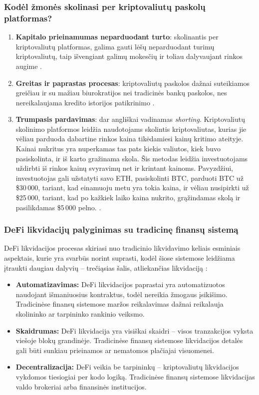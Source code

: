 \documentclass[]{VUMIFTemplateClass}
\begin{document}
\subsubsection{Kodėl žmonės skolinasi per kriptovaliutų paskolų platformas?}

\begin{enumerate}
    \item \textbf{Kapitalo prieinamumas neparduodant turto}: skolinantis per kriptovaliutų platformas, galima gauti lėšų neparduodant turimų kriptovaliutų, taip išvengiant galimų mokesčių ir toliau dalyvaujant rinkos augime \cite{kriptovaliutosio}.
    \item \textbf{Greitas ir paprastas procesas}: kriptovaliutų paskolos dažnai suteikiamos greičiau ir su mažiau biurokratijos nei tradicinės bankų paskolos, nes nereikalaujama kredito istorijos patikrinimo \cite{targettrend}.
    \item \textbf{Trumpasis pardavimas}: dar angliškai vadinamas \textit{shorting}. Kriptovaliutų skolinimo platformos leidžia naudotojams skolintis kriptovaliutas, kurias jie vėliau parduoda dabartine rinkos kaina tikėdamiesi kainų kritimo ateityje. Kainai nukritus yra nuperkamas tas pats kiekis valiutos, kiek buvo pasiskolinta, ir iš karto gražinama skola. Šis metodas leidžia investuotojams uždirbti iš rinkos kainų svyravimų net ir krintant kainoms. Pavyzdžiui, investuotojas gali užstatyti savo ETH, pasiskolinti BTC, parduoti BTC už \$30\,000, tariant, kad einamuoju metu yra tokia kaina, ir vėliau nusipirkti už \$25\,000, tariant, kad po kažkiek laiko kaina nukrito, grąžindamas skolą ir pasilikdamas \$5\,000 pelno.
    \cite{shortinimas}.
\end{enumerate}

\subsubsection{DeFi likvidacijų palyginimas su tradicinę finansų sistemą}
DeFi likvidacijos procesas skiriasi nuo tradicinio likvidavimo keliais esminiais aspektais, kurie yra svarbūs norint suprasti, kodėl šiose sistemose leidžiama įtraukti daugiau dalyvių – trečiąsias šalis, atliekančias likvidaciją \cite{whatisdefiliquidation}:

\begin{itemize}
    \item \textbf{Automatizavimas:} DeFi likvidacijos paprastai yra automatizuotos naudojant išmaniuosius kontraktus, todėl nereikia žmogaus įsikišimo. Tradicinėse finansų sistemose maržos reikalavimas dažnai reikalauja skolininko ar tarpininko rankinio veiksmo.
    
    \item \textbf{Skaidrumas:} DeFi likvidacija yra visiškai skaidri – visos tranzakcijos vyksta viešoje blokų grandinėje. Tradicinėse finansų sistemose likvidacijos detalės gali būti sunkiau prieinamos ar nematomos plačiajai visuomenei.
    
    \item \textbf{Decentralizacija:} DeFi veikia be tarpininkų – kriptovaliutų likvidacijos vykdomos tiesiogiai per kodo logiką. Tradicinėse finansų sistemose likvidacijas valdo brokeriai arba finansinės institucijos.
\end{itemize}
\end{document}
